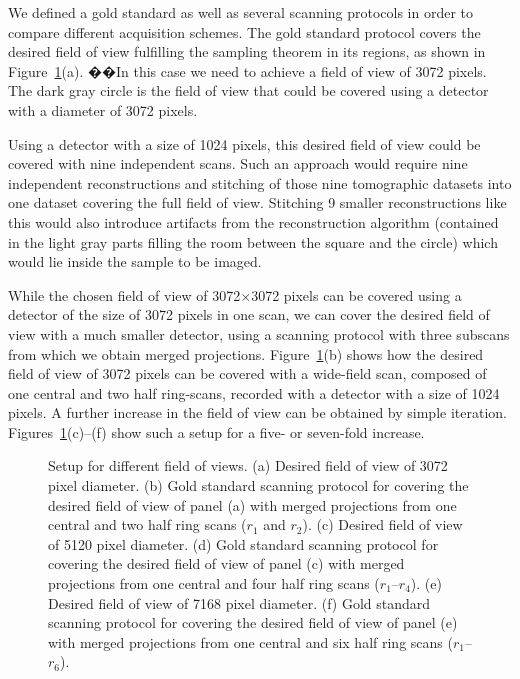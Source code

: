 We defined a gold standard as well as several scanning protocols in order to compare different acquisition schemes. The gold standard protocol covers the desired field of view fulfilling the sampling theorem in its regions, as shown in Figure~\ref{fig:SubScan-Setup}(a). ��In this case we need to achieve a field of view of 3072 pixels. The dark gray circle is the field of view that could be covered using a detector with a diameter of 3072 pixels.

Using a detector with a size of 1024 pixels, this desired field of view could be covered with nine independent scans. Such an approach would require nine independent reconstructions and stitching of those nine tomographic datasets into one dataset covering the full field of view. Stitching 9 smaller reconstructions like this would also introduce artifacts from the reconstruction algorithm (contained in the light gray parts filling the room between the square and the circle) which would lie inside the sample to be imaged.

While the chosen field of view of 3072$\times$3072 pixels can be covered using a detector of the size of 3072 pixels in one scan, we can cover the desired field of view with a much smaller detector, using a scanning protocol with three subscans from which we obtain merged projections. Figure~\ref{fig:SubScan-Setup}(b) shows how the desired field of view of 3072 pixels can be covered with a wide-field scan, composed of one central and two half ring-scans, recorded with a detector with a size of 1024 pixels. A further increase in the field of view can be obtained by simple iteration. Figures~\ref{fig:SubScan-Setup}(c)--(f) show such a setup for a five- or seven-fold increase.

\begin{figure}
	\centering
	\caption{Setup for different field of views. %
		(a) Desired field of view of 3072 pixel diameter. %
		(b) Gold standard scanning protocol for covering the desired field of view of panel (a) with merged projections from one central and two half ring scans ($r_{1}$ and $r_{2}$). %
		(c) Desired field of view of 5120 pixel diameter. %
		(d) Gold standard scanning protocol for covering the desired field of view of panel (c) with merged projections from one central and four half ring scans ($r_{1}$--$r_{4}$). %
		(e) Desired field of view of 7168 pixel diameter. %
		(f) Gold standard scanning protocol for covering the desired field of view of panel (e) with merged projections from one central and six half ring scans ($r_{1}$--$r_{6}$).}%
	\ifiucr		
		
	\else
	\fi
	\label{fig:SubScan-Setup}
\end{figure}

